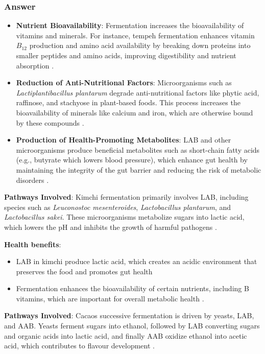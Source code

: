 \subsubsection*{Answer}
\begin{itemize}
    \item \textbf{Nutrient Bioavailability}: Fermentation increases the bioavailability of vitamins and minerals. For instance, tempeh fermentation enhances vitamin $B_{12}$ production and amino acid availability by breaking down proteins into smaller peptides and amino acids, improving digestibility and nutrient absorption \cite*{LS22}.
    \item \textbf{Reduction of Anti-Nutritional Factors}: Microorganisms such as \textit{Lactiplantibacillus plantarum} degrade anti-nutritional factors like phytic acid, raffinose, and stachyose in plant-based foods. This process increases the bioavailability of minerals like calcium and iron, which are otherwise bound by these compounds \cite*{LS22}.
    \item \textbf{Production of Health-Promoting Metabolites}: LAB and other microorganisms produce beneficial metabolites such as short-chain fatty acids (e.g., butyrate which lowers blood pressure), which enhance gut health by maintaining the integrity of the gut barrier and reducing the risk of metabolic disorders \cite*{LS22,LS19}.
\end{itemize}

\textbf{Pathways Involved}: Kimchi fermentation primarily involves LAB, including species such as \textit{Leuconostoc mesenteroides}, \textit{Lactobacillus plantarum}, and \textit{Lactobacillus sakei}. These microorganisms metabolize sugars into lactic acid, which lowers the pH and inhibits the growth of harmful pathogens \cite*{LS14}.

\textbf{Health benefits}:
\begin{itemize}
    \item LAB in kimchi produce lactic acid, which creates an acidic environment that preserves the food and promotes gut health \cite*{LS14}
    \item Fermentation enhances the bioavailability of certain nutrients, including B vitamins, which are important for overall metabolic health \cite*{LS19}.
\end{itemize}

\textbf{Pathways Involved}: Cacaos successive fermentation is driven by yeasts, LAB, and AAB. Yeasts ferment sugars into ethanol, followed by LAB converting sugars and organic acids into lactic acid, and finally AAB oxidize ethanol into acetic acid, which contributes to flavour development \cite*{ORM_1}.

